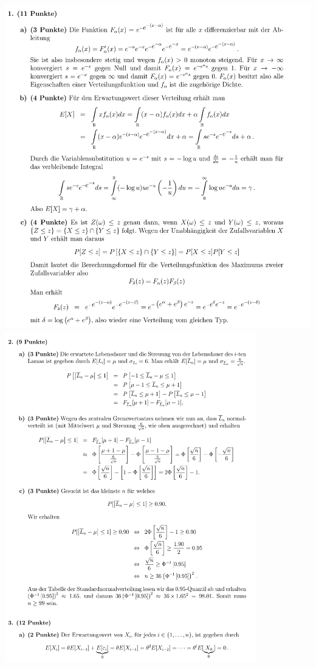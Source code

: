 \includegraphics[height=143mm]{old_exams_prtsrc/cher_infk_wi19_ml-1.png}\newline
\includegraphics[height=143mm]{old_exams_prtsrc/cher_infk_wi19_ml-2.png}\newline
